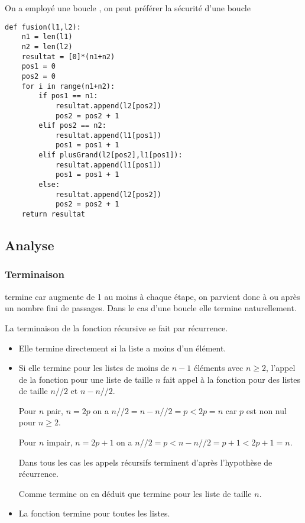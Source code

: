 On a employé une boucle , on peut préférer la sécurité d'une boucle 
\begin{lstlisting}
def fusion(l1,l2):
    n1 = len(l1)
    n2 = len(l2)
    resultat = [0]*(n1+n2)
    pos1 = 0
    pos2 = 0
    for i in range(n1+n2):
        if pos1 == n1:
            resultat.append(l2[pos2])
            pos2 = pos2 + 1
        elif pos2 == n2:
            resultat.append(l1[pos1])
            pos1 = pos1 + 1
        elif plusGrand(l2[pos2],l1[pos1]):
            resultat.append(l1[pos1])
            pos1 = pos1 + 1
        else:
            resultat.append(l2[pos2])
            pos2 = pos2 + 1
    return resultat
\end{lstlisting}
\subsection{Analyse}
\subsubsection{Terminaison}
 termine car  augmente de 1 au moins à chaque étape, on parvient donc à  ou  après un nombre fini de passages. Dans le cas d'une boucle  elle termine naturellement.

La terminaison de la fonction récursive  se fait par récurrence.

\begin{itemize}
\item Elle termine directement si la liste a moins d'un élément.

\item Si elle termine pour les listes de moins de $n-1$ éléments avec $n\ge 2$, l'appel de la fonction pour une liste de taille $n$ fait appel à la fonction pour des listes de taille $n// 2$ et $n-n//2$.

Pour $n$ pair, $n=2p$ on a $n// 2=n-n//2=p < 2p=n$ car $p$ est non nul pour $n\ge 2$.

Pour $n$ impair, $n=2p+1$ on a $n// 2=p< n-n// 2=p+1<2p+1=n$.

Dans tous les cas les appels récursifs terminent d'après l'hypothèse de récurrence.

Comme  termine on en déduit que  termine pour les liste de taille $n$.

\item La fonction  termine pour toutes les listes.
\end{itemize}
